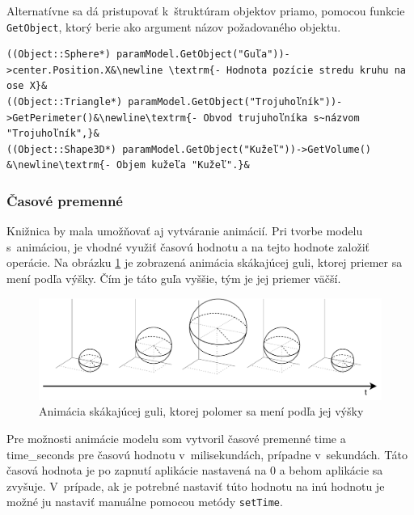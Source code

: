 Alternatívne sa dá pristupovať k~štruktúram objektov priamo, pomocou funkcie \newline \texttt{GetObject}, ktorý berie ako argument názov požadovaného objektu.
\begin{lstlisting}
((Object::Sphere*) paramModel.GetObject("Guľa"))->center.Position.X&\newline \textrm{- Hodnota pozície stredu kruhu na ose X}&
((Object::Triangle*) paramModel.GetObject("Trojuhoľník"))->GetPerimeter()&\newline\textrm{- Obvod trujuhoľníka s~názvom "Trojuhoľník",}&
((Object::Shape3D*) paramModel.GetObject("Kužeľ"))->GetVolume() &\newline\textrm{- Objem kužeľa "Kužeľ".}&
\end{lstlisting}


\subsubsection*{Časové premenné}
Knižnica by mala umožňovať aj vytváranie animácií. Pri tvorbe modelu s~animáciou, je vhodné využiť časovú hodnotu a na tejto hodnote založiť operácie. Na obrázku \ref{fig:animation} je zobrazená animácia skákajúcej guli, ktorej priemer sa mení podľa výšky. Čím je táto guľa vyššie, tým je jej priemer väčší.



\begin{figure}[H]
	\centering
	\includegraphics[width=1\textwidth]{obrazky-figures/Diagram/DP Navrh operacii-Ball Animation.pdf}
	\caption{Animácia skákajúcej guli, ktorej polomer sa mení podľa jej výšky}
	\label{fig:animation}
\end{figure}



Pre možnosti animácie modelu som vytvoril časové premenné time a time\_seconds pre časovú hodnotu v~milisekundách, prípadne v~sekundách. Táto časová hodnota je po zapnutí aplikácie nastavená na 0 a behom aplikácie sa zvyšuje. V~prípade, ak je potrebné nastaviť túto hodnotu na inú hodnotu je možné ju nastaviť manuálne pomocou metódy \texttt{setTime}.\nopagebreak


